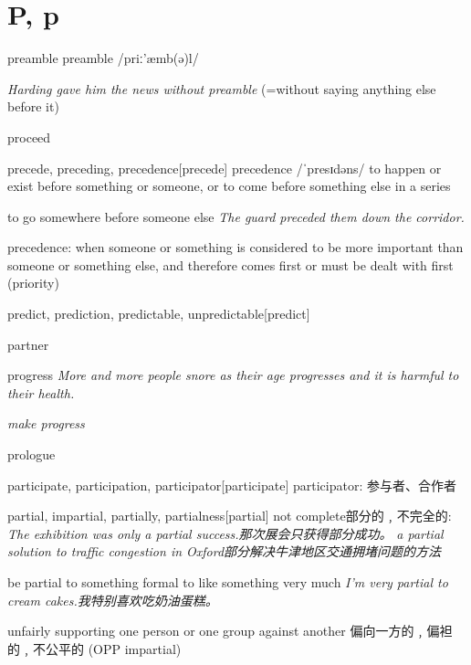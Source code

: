 \section{P, p}

\begin{DefWord}{preamble}
    preamble /priː'æmb(ə)l/

\textit{Harding gave him the news without preamble} (=without saying anything else before it)
\end{DefWord}

\begin{DefWord}{proceed}
\end{DefWord}

\begin{DefWord}{precede, preceding, precedence}[precede]
    precedence /ˈpresɪdəns/
    to happen or exist before something or someone, or to come before something else in a series

    to go somewhere before someone else
    \textit{The guard preceded them down the corridor.}

    precedence: when someone or something is considered to be more important than someone or something else, and therefore comes first or must be dealt with first (priority)
\end{DefWord}


\begin{DefWord}{predict, prediction, predictable, unpredictable}[predict]
\end{DefWord}

\begin{DefWord}{partner}
\end{DefWord}

\begin{DefWord}{progress}
    \textit{More and more people snore as their age progresses and it is harmful to their health.}

    \textit{make progress}
\end{DefWord}

\begin{DefWord}{prologue}
\end{DefWord}

\begin{DefWord}{participate, participation, participator}[participate]
    participator: 参与者、合作者
\end{DefWord}

\begin{DefWord}{partial, impartial, partially, partialness}[partial]
    not complete部分的﹐不完全的:
    \textit{The exhibition was only a partial success.那次展会只获得部分成功。}
    \textit{a partial solution to traffic congestion in Oxford部分解决牛津地区交通拥堵问题的方法}

    be partial to something formal to like something very much
    \textit{I'm very partial to cream cakes.我特别喜欢吃奶油蛋糕。}

    unfairly supporting one person or one group against another 偏向一方的﹐偏袒的﹐不公平的 (OPP impartial)
\end{DefWord}

